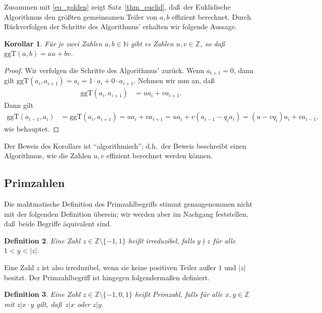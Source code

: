 \documentclass[10pt,reqno]{amsart}
\numberwithin{equation}{section}
\newcommand\ggt{\ggT}
\newcommand\ggT{\mathrm{ggT}}
\newcommand\NN{\mathbb N}
\newcommand\ZZ{\mathbb Z}
\newtheorem{definition}{Definition}[section]
\newtheorem{corollary}[definition]{Korollar}
\newcommand\Thm{Satz}
\begin{document}
Zusammen mit \eqref{eq_golden} zeigt \Thm~\ref{thm_euclid}, da\ss\ der Euklidische Algorithmus den gr\"o\ss ten gemeinsamen Teiler von $a,b$ effizient berechnet.
Durch R\"uckverfolgen der Schritte des Algorithmus' erhalten wir folgende Aussage.

\begin{corollary}\label{cor_euclid}
	F\"ur je zwei Zahlen $a,b\in\NN$ gibt es Zahlen $u,v\in\ZZ$, so da\ss\ $\ggt(a,b)=au+bv$.
\end{corollary}
\begin{proof}
	Wir verfolgen die Schritte des Algorithmus' zur\"uck.
	Wenn $a_{i+1}=0$, dann gilt $\ggt(a_i,a_{i+1})=a_{i}=1\cdot a_{i}+0\cdot a_{i+1}$.
	Nehmen wir nun an, da\ss\
	\begin{align*}
		\ggt(a_i,a_{i+1})&=ua_i+va_{i+1}.
	\end{align*}
	Dann gilt
	\begin{align*}
		\ggt(a_{i-1},a_i)&=\ggt(a_i,a_{i+1})=ua_i+va_{i+1}=ua_i+v(a_{i-1}-q_ia_i)=(u-vq_i)a_i+va_{i-1},
	\end{align*}
	wie behauptet.
\end{proof}

Der Beweis des Korollars ist ``algorithmisch''; d.h.\ der Beweis beschreibt einen Algorithmus, wie die Zahlen $u,v$ effizient berechnet werden k\"onnen.

\subsection{Primzahlen}\label{sec_prime}

Die mahtmatische Definition des Primzahlbegriffs stimmt genaugenommen nicht mit der folgenden Definition \"uberein; wir werden aber im Nachgang feststellen, da\ss\ beide Begriffe \"aquivalent sind.

\begin{definition}\label{def_irreducible}
	Eine Zahl $z\in\ZZ\setminus\{-1,1\}$ hei\ss t {\em irreduzibel}, falls $y\nmid z$ f\"ur alle $1<y<|z|$.
\end{definition}

Eine Zahl $z$ ist also irreduzibel, wenn sie keine positiven Teiler au\ss er $1$ und $|z|$ besitzt.
Der Primzahlbegriff ist hingegen folgenderma\ss en definiert.

\begin{definition}\label{def_prime}
	Eine Zahl $z\in\ZZ\setminus\{-1,0,1\}$ hei\ss t {\em Primzahl}, falls f\"ur alle $x,y\in\ZZ$ mit $z|x\cdot y$ gilt, da\ss\ $z|x$ oder $z|y$.
\end{definition}
\end{document}

